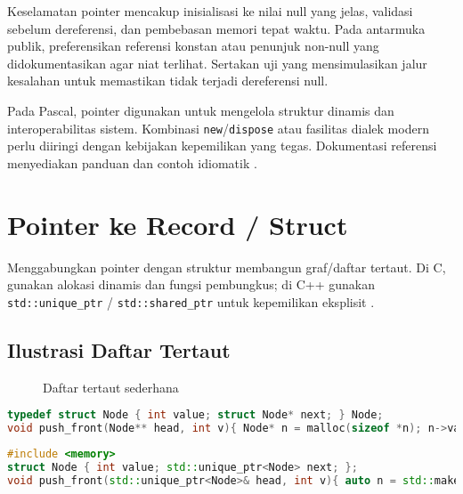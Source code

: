\documentclass[../main.tex]{subfiles}
\begin{document}
Keselamatan pointer mencakup inisialisasi ke nilai null yang jelas, validasi sebelum dereferensi, dan pembebasan memori tepat waktu. Pada antarmuka publik, preferensikan referensi konstan atau penunjuk non-null yang didokumentasikan agar niat terlihat. Sertakan uji yang mensimulasikan jalur kesalahan untuk memastikan tidak terjadi dereferensi null.

Pada Pascal, pointer digunakan untuk mengelola struktur dinamis dan interoperabilitas sistem. Kombinasi \texttt{new}/\texttt{dispose} atau fasilitas dialek modern perlu diiringi dengan kebijakan kepemilikan yang tegas. Dokumentasi referensi menyediakan panduan dan contoh idiomatik \parencite{free-pascal-docs,gnu-c-manual}.

\section{Pointer ke Record / Struct}
Menggabungkan pointer dengan struktur membangun graf/daftar tertaut. Di C, gunakan alokasi dinamis dan fungsi pembungkus; di C++ gunakan \texttt{std::unique\_ptr} / \texttt{std::shared\_ptr} untuk kepemilikan eksplisit \parencite{cpp-reference}.

\subsection{Ilustrasi Daftar Tertaut}
\begin{figure}[h]
  \centering
  \caption{Daftar tertaut sederhana}
\end{figure}

\begin{lstlisting}[language=C, caption={Node dan insert di depan (C)}]
typedef struct Node { int value; struct Node* next; } Node;
void push_front(Node** head, int v){ Node* n = malloc(sizeof *n); n->value=v; n->next=*head; *head=n; }
\end{lstlisting}

\begin{lstlisting}[language=C++, caption={unique_ptr untuk daftar (C++)}]
#include <memory>
struct Node { int value; std::unique_ptr<Node> next; };
void push_front(std::unique_ptr<Node>& head, int v){ auto n = std::make_unique<Node>(); n->value=v; n->next = std::move(head); head = std::move(n); }
\end{lstlisting}
\end{document}
